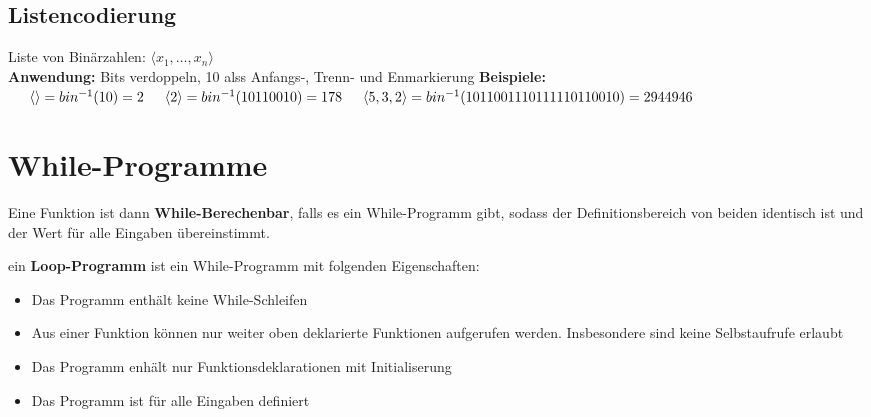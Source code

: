 \documentclass[14pt]{article}
\begin{document}
        \subsection{Listencodierung}
        Liste von Binärzahlen: $\langle x_1, \dots, x_n \rangle$ \\
        \textbf{Anwendung:} Bits verdoppeln, 10 alss Anfangs-, Trenn- und Enmarkierung
        \textbf{Beispiele:} \\
        $
            \indent \langle \rangle = bin^{-1}(10) = 2 \\
            \indent \langle 2 \rangle = bin^{-1}(10110010) = 178 \\
            \indent \langle 5, 3, 2 \rangle = bin^{-1}(1011001110111110110010) = 2944946
        $
    \section{While-Programme}
    \begin{definition}
        Eine Funktion ist dann \textbf{While-Berechenbar}, falls es 
        ein While-Programm gibt, sodass der Definitionsbereich von 
        beiden identisch ist und der Wert für alle Eingaben übereinstimmt.
    \end{definition}
    \begin{definition}
        ein \textbf{Loop-Programm} ist ein While-Programm mit folgenden
        Eigenschaften: 
        \begin{itemize}
            \item Das Programm enthält keine While-Schleifen
            \item Aus einer Funktion können nur weiter oben deklarierte
            Funktionen aufgerufen werden. Insbesondere sind keine 
            Selbstaufrufe erlaubt
            \item Das Programm enhält nur Funktionsdeklarationen mit 
            Initialiserung
            \item Das Programm ist für alle Eingaben definiert
        \end{itemize}
    \end{definition}
\end{document}
